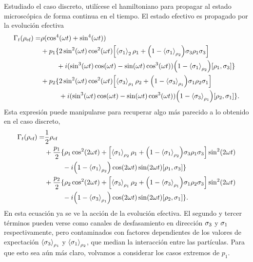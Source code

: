 Estudiado el caso discreto, utilícese el hamiltoniano para propagar al estado microscópica de forma continua en el tiempo. El estado efectivo es propagado por la evolución efectiva
\begin{align}
  \Gamma_{t}(\rho_{\text{ef}})=&\rho(\cos^{4}(\omega t)+\sin^{4}(\omega t))\nonumber\\
  &+p_{1}\{2\sin^{2}(\omega t)\cos^{2}(\omega
  t)\qty[\expval{\sigma_{1}}_{2}\rho_{1}+\qty(1-\expval{\sigma_{1}}_{\rho_{2}})\sigma_{3}\rho_{1}\sigma_{3}]\nonumber\\
  & \ \ \ \ \ \ \ +i(\sin^{3}(\omega t)\cos(\omega t)-\sin(\omega t)\cos^{3}(\omega t))\qty(1-\expval{\sigma_{1}}_{\rho_{2}})[\rho_{1},\sigma_{3}]\}\nonumber\\
  &+p_{2}\{2\sin^{2}(\omega t)\cos^{2}(\omega t)\qty[\expval{\sigma_{3}}_{\rho_{1}}\rho_{2}+\qty(1-\expval{\sigma_{3}}_{\rho_{1}})\sigma_{1}\rho_{2}\sigma_{1}]\nonumber\\
  &\ \ \ \ \ \ \ \ +i(\sin^{3}(\omega t)\cos(\omega t)-\sin(\omega t)\cos^{3}(\omega t))\qty(1-\expval{\sigma_{3}}_{\rho_{1}})[\rho_{2},\sigma_{1}]\}.\nonumber
\end{align} 
Esta expresión puede manipularse para recuperar algo más parecido a lo obtenido en el caso discreto,
\begin{align}
  \Gamma_{t}(\rho_{\ef})=&\frac{1}{2}\rho_{\ef}\nonumber\\
  &+\frac{p_{1}}{2}\{\rho_{1}\cos^{2}(2\omega t)+\qty[\expval{\pauli{1}}_{\rho_{2}}\rho_{1}+\qty(1-\expval{\pauli{1}}_{\rho_{2}})\pauli{3}\rho_{1}\pauli{3}]\sin^{2}(2\omega t)\nonumber\\
  & \ \ \ \ \ \ \ \ -i\qty(1-\expval{\pauli{1}}_{\rho_{2}})\cos(2\omega t)\sin(2\omega t)[\rho_{1},\pauli{3}]\}\nonumber\\
  &+\frac{p_{2}}{2}\{\rho_{2}\cos^{2}(2\omega t)+\qty[\expval{\pauli{3}}_{\rho_{1}}\rho_{2}+\qty(1-\expval{\pauli{3}}_{\rho_{1}})\pauli{1}\rho_{2}\pauli{3}]\sin^{2}(2\omega t)\nonumber\\
  & \ \ \ \ \ \ \ \ -i\qty(1-\expval{\pauli{3}}_{\rho_{1}})\cos(2\omega t)\sin(2\omega t)[\rho_{2},\pauli{1}]\}.\nonumber
\end{align}
En esta ecuación ya se ve la acción de la evolución efectiva. El segundo y tercer términos pueden verse como canales de desfasamiento en dirección $\sigma_{3}$ y $\sigma_{1}$ respectivamente, pero contaminados con factores dependientes de los valores de expectación $\expval{\sigma_{3}}_{\rho_{1}}$ y $\expval{\sigma_{1}}_{\rho_{2}}$, que median la interacción entre las partículas. Para que esto sea aún más claro, volvamos a considerar los casos extremos de $p_{1}$.

